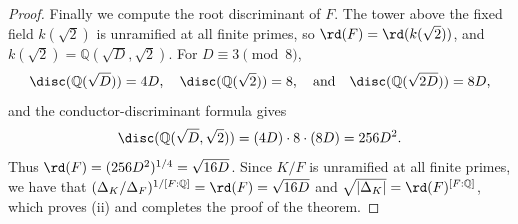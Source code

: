 \begin{proof}
Finally we compute the root discriminant of $F$.  The tower above the fixed field $k(\sqrt2)$ is unramified at all finite primes, so $\rd(F)=\rd(k(\sqrt2))$, and $k(\sqrt2)=\mathbb{Q}(\sqrt D,\sqrt2)$.  For $D\equiv3\pmod8$,
\[
   \disc(\mathbb{Q}(\sqrt D))=4D,
   \ \ \ \disc(\mathbb{Q}(\sqrt2))=8,
   \ \ \ \text{and}\ \ \
   \disc(\mathbb{Q}(\sqrt{2D}))=8D,
\]
and the conductor-discriminant formula gives
\[
   \disc(\mathbb{Q}(\sqrt D,\sqrt2))=(4D)\cdot8\cdot(8D)=256D^2.
\]
Thus $\rd(F)=(256D^2)^{1/4}=\sqrt{16D}$.  Since $K/F$ is unramified at all finite primes, we have that $(\Delta_K/\Delta_F)^{1/[F:\mathbb{Q}]}=\rd(F)=\sqrt{16D}$ and $\sqrt{|\Delta_K|}=\rd(F)^{[F:\mathbb{Q}]}$, which proves (ii) and completes the proof of the theorem.
\end{proof}
